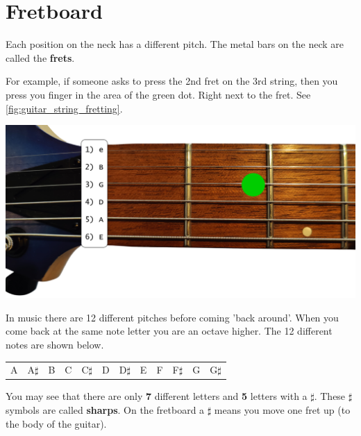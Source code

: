 \section{Fretboard}

\begin{minipage}{0.48\textwidth}
Each position on the neck has a different pitch. The metal bars on the neck are called the \textbf{frets}.

For example, if someone asks to press the 2nd fret on the 3rd string, then you press you finger in the area of the green dot. Right next to the fret. See \ref{fig:guitar_string_fretting}.
\end{minipage}
\hfill
\begin{minipage}{0.48\textwidth}
    \centering
    \includegraphics[width=\textwidth]{../Images/guitar-neck-fretting.png}
    \label{fig:guitar_string_fretting}
\end{minipage}

In music there are 12 different pitches before coming 'back around'. When you come back at the same note letter you are an octave higher. The 12 different notes are shown below.

\begin{table}[h]
\centering
\begin{tabular}{*{12}{P{5mm}}}
\large{A} & \large{A$\sharp$} & \large{B} & \large{C} & \large{C$\sharp$} & \large{D} & \large{D$\sharp$} & \large{E} & \large{F} & \large{F$\sharp$} & \large{G} & \large{G$\sharp$}
\end{tabular}
\end{table}

You may see that there are only \textbf{7} different letters and \textbf{5} letters with a \textbf{$\sharp$}. These $\sharp$ symbols are called \textbf{sharps}. On the fretboard a $\sharp$ means you move one fret up (to the body of the guitar).

